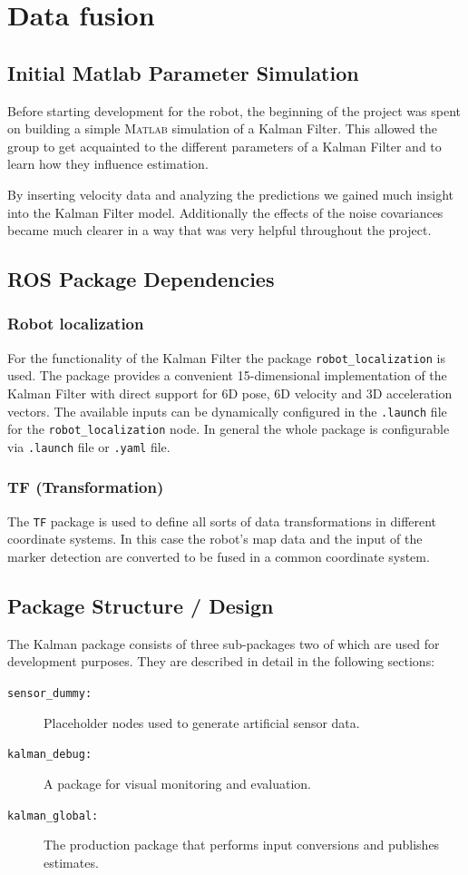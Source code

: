 \chapter{Data fusion}
\label{Kalman chapter}
\section{Initial Matlab Parameter Simulation}
Before starting development for the robot, the beginning of the project was spent on building a simple \textsc{Matlab} simulation of a Kalman Filter.
This allowed the group to get acquainted to the different parameters of a Kalman Filter and to learn how they influence estimation.

By inserting velocity data and analyzing the predictions we gained much insight into the Kalman Filter model. Additionally the effects of the noise covariances became much clearer in a way that was very helpful throughout the project.

\section{ROS Package Dependencies}
\subsection{Robot localization}
For the functionality of the Kalman Filter the package \texttt{robot\_localization} is used. The package provides a convenient 15-dimensional implementation of the Kalman Filter with direct support for 6D pose, 6D velocity and 3D acceleration vectors. The available inputs can be dynamically configured in the \texttt{.launch} file for the \texttt{robot\_localization} node. In general the whole package is configurable via \texttt{.launch} file or \texttt{.yaml} file.

\subsection{TF (Transformation)}
The \texttt{TF} package is used to define all sorts of data transformations in different coordinate systems. In this case the robot's map data and the input of the marker detection are converted to be fused in a common coordinate system. 

\section{Package Structure / Design}
The Kalman package consists of three sub-packages two of which are used for development purposes. They are described in detail in the following sections:
\begin{description}
\item[\texttt{sensor\_dummy:}] Placeholder nodes used to generate artificial sensor data.
\item[\texttt{kalman\_debug:}] A package for visual monitoring and evaluation.
\item[\texttt{kalman\_global:}] The production package that performs input conversions and publishes estimates.
\end{description}

